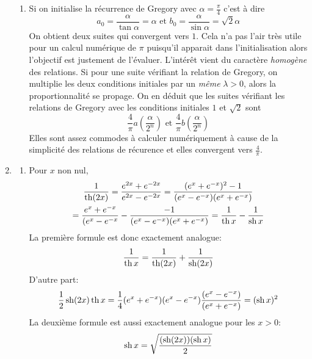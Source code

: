 \begin{enumerate}
\begin{enumerate}
  \item Si on initialise la récurrence de Gregory avec $\alpha = \frac{\pi}{4}$ c'est à dire
\begin{displaymath}
a_0 = \frac{\alpha}{\tan \alpha } = \alpha \text{ et }   b_0 = \frac{\alpha}{\sin \alpha } = \sqrt{2} \alpha
\end{displaymath}
On obtient deux suites qui convergent vers $1$. Cela n'a pas l'air très utile pour un calcul numérique de $\pi$ puisqu'il apparait dans l'initialisation alors l'objectif est justement de l'évaluer. L'intérêt vient du caractère \emph{homogène} des relations. Si pour une suite vérifiant la relation de Gregory, on multiplie les deux conditions initiales par un \emph{même} $\lambda >0$, alors la proportionnalité se propage. On en déduit que les suites vérifiant les relations de Gregory avec les conditions initiales $1$ et $\sqrt{2}$ sont 
\begin{displaymath}
  \frac{4}{\pi}a(\frac{\alpha}{2^n}) \text{ et } \frac{4}{\pi}b(\frac{\alpha}{2^n})
\end{displaymath}
Elles sont assez commodes à calculer numériquement à cause de la simplicité des relations de récurence et elles convergent vers $\frac{4}{\pi}$.
\end{enumerate}

\item
\begin{enumerate}
  \item Pour $x$ non nul,
\begin{multline*}
  \frac{1}{\operatorname{th}(2x)} = \frac{e^{2x} + e^{-2x}}{e^{2x} - e^{-2x}}
  = \frac{(e^{x} + e^{-x})^2-1}{(e^{x} - e^{-x})(e^{x} + e^{-x})} \\
  = \frac{e^{x} + e^{-x}}{(e^{x} - e^{-x}} - \frac{-1}{(e^{x} - e^{-x})(e^{x} + e^{-x})}
  = \frac{1}{\operatorname{th} x} - \frac{1}{\operatorname{sh} x}
\end{multline*}
La première formule est donc exactement analogue:
\begin{displaymath}
  \frac{1}{\operatorname{th} x} = \frac{1}{\operatorname{th}(2x)} + \frac{1}{\operatorname{sh}(2x)}
\end{displaymath}
D'autre part:
\begin{displaymath}
\frac{1}{2}\operatorname{sh}(2x) \operatorname{th} x = \frac{1}{4}(e^{x}+e^{-x}) (e^{x}-e^{-x})\frac{(e^{x}-e^{-x})}{(e^{x}+e^{-x})} = (\operatorname{sh} x)^2 
\end{displaymath}
La deuxième formule est aussi exactement analogue pour les $x>0$:
\begin{displaymath}
  \operatorname{sh} x = \sqrt{\frac{(\operatorname{sh}(2x))(\operatorname{sh} x)}{2}}
\end{displaymath}


\end{enumerate}
\end{enumerate}
